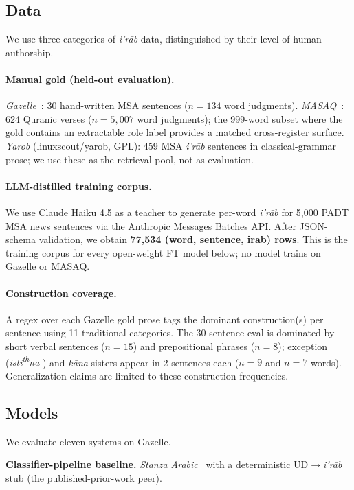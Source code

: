 \documentclass[10pt,a4paper,twocolumn]{article}
\newcommand{\irab}{\textit{i'r{\=a}b}}
\begin{document}
\subsection{Data}
\label{sec:data}
We use three categories of \irab{} data, distinguished by their level of human authorship.

\paragraph{Manual gold (held-out evaluation).}
\emph{Gazelle}~\cite{hijjawi2024gazelle}: 30 hand-written MSA sentences ($n{=}134$ word judgments). \emph{MASAQ}~\cite{sawalha2025masaq}: 624 Quranic verses ($n{=}5{,}007$ word judgments); the 999-word subset where the gold contains an extractable role label provides a matched cross-register surface. \emph{Yarob} (linuxscout/yarob, GPL): 459 MSA \irab{} sentences in classical-grammar prose; we use these as the retrieval pool, not as evaluation.

\paragraph{LLM-distilled training corpus.}
We use Claude Haiku 4.5 as a teacher to generate per-word \irab{} for 5{,}000 PADT MSA news sentences via the Anthropic Messages Batches API. After JSON-schema validation, we obtain \textbf{77{,}534 (word, sentence, irab) rows}. This is the training corpus for every open-weight FT model below; no model trains on Gazelle or MASAQ.

\paragraph{Construction coverage.}
A regex over each Gazelle gold prose tags the dominant construction(s) per sentence using 11 traditional categories. The 30-sentence eval is dominated by short verbal sentences ($n{=}15$) and prepositional phrases ($n{=}8$); exception (\emph{isti\textsuperscript{th}n\=a$\,$\textsuperscript{}$\,$}) and \emph{k\=ana} sisters appear in 2 sentences each ($n{=}9$ and $n{=}7$ words). Generalization claims are limited to these construction frequencies.

\subsection{Models}
\label{sec:models}
We evaluate eleven systems on Gazelle.

\noindent\textbf{Classifier-pipeline baseline.} \emph{Stanza Arabic}~\cite{qi2020stanza} with a deterministic UD$\rightarrow$\irab{} stub (the published-prior-work peer).
\end{document}
